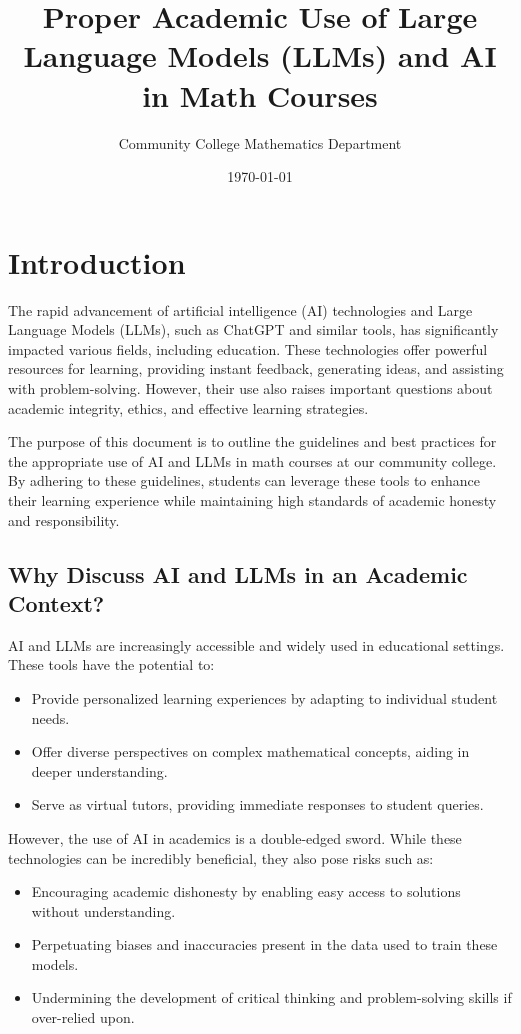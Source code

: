 \documentclass{article}
\title{Proper Academic Use of Large Language Models (LLMs) and AI in Math Courses}
\author{Community College Mathematics Department}
\date{\today}
\begin{document}
\maketitle

\tableofcontents

\section{Introduction}

The rapid advancement of artificial intelligence (AI) technologies and Large Language Models (LLMs), such as ChatGPT and similar tools, has significantly impacted various fields, including education. These technologies offer powerful resources for learning, providing instant feedback, generating ideas, and assisting with problem-solving. However, their use also raises important questions about academic integrity, ethics, and effective learning strategies. 

The purpose of this document is to outline the guidelines and best practices for the appropriate use of AI and LLMs in math courses at our community college. By adhering to these guidelines, students can leverage these tools to enhance their learning experience while maintaining high standards of academic honesty and responsibility.

\subsection{Why Discuss AI and LLMs in an Academic Context?}

AI and LLMs are increasingly accessible and widely used in educational settings. These tools have the potential to:
\begin{itemize}
    \item Provide personalized learning experiences by adapting to individual student needs.
    \item Offer diverse perspectives on complex mathematical concepts, aiding in deeper understanding.
    \item Serve as virtual tutors, providing immediate responses to student queries.
\end{itemize}

However, the use of AI in academics is a double-edged sword. While these technologies can be incredibly beneficial, they also pose risks such as:
\begin{itemize}
    \item Encouraging academic dishonesty by enabling easy access to solutions without understanding.
    \item Perpetuating biases and inaccuracies present in the data used to train these models.
    \item Undermining the development of critical thinking and problem-solving skills if over-relied upon.
\end{itemize}
\end{document}

